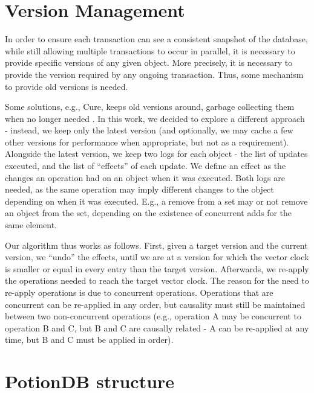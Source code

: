 \section{Version Management}
\label{sec:version_management}

In order to ensure each transaction can see a consistent snapshot of the database, while still allowing multiple transactions to occur in parallel, it is necessary to provide specific versions of any given object.
More precisely, it is necessary to provide the version required by any ongoing transaction.
Thus, some mechanism to provide old versions is needed.

Some solutions, e.g., Cure, keeps old versions around, garbage collecting them when no longer needed \cite{cure}.
In this work, we decided to explore a different approach - instead, we keep only the latest version (and optionally, we may cache a few other versions for performance when appropriate, but not as a requirement).
Alongside the latest version, we keep two logs for each object - the list of updates executed, and the list of ``effects'' of each update.
We define an effect as the changes an operation had on an object when it was executed.
Both logs are needed, as the same operation may imply different changes to the object depending on when it was executed.
E.g., a remove from a set may or not remove an object from the set, depending on the existence of concurrent adds for the same element.

Our algorithm thus works as follows.
First, given a target version and the current version, we ``undo'' the effects, until we are at a version for which the vector clock is smaller or equal in every entry than the target version.
Afterwards, we re-apply the operations needed to reach the target vector clock.
The reason for the need to re-apply operations is due to concurrent operations.
Operations that are concurrent can be re-applied in any order, but causality must still be maintained between two non-concurrent operations (e.g., operation A may be concurrent to operation B and C, but B and C are causally related - A can be re-applied at any time, but B and C must be applied in order).


\section{PotionDB structure}
\label{sec:potiondb_structure}


